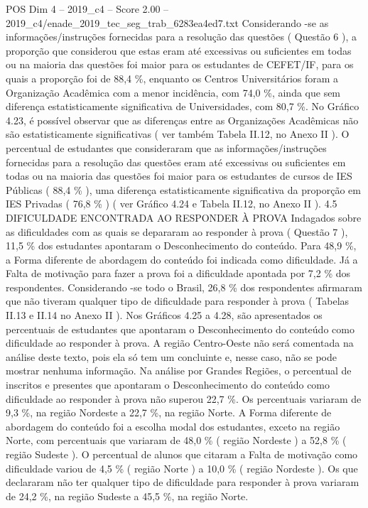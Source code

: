 \begin{textsample}{POS Dim 4 – 2019\_c4 – Score 2.00 – 2019\_c4/enade\_2019\_tec\_seg\_trab\_6283ea4ed7.txt}
Considerando -se as informações/instruções fornecidas para a resolução das questões ( Questão 6 ), a proporção que considerou que estas eram até excessivas ou suficientes em todas ou na maioria das questões foi maior para os estudantes de CEFET/IF, para os quais a proporção foi de 88,4 \%, enquanto os Centros Universitários foram a Organização Acadêmica com a menor incidência, com 74,0 \%, ainda que sem diferença estatisticamente significativa de Universidades, com 80,7 \%.
No Gráfico 4.23, é possível observar que as diferenças entre as Organizações Acadêmicas não são estatisticamente significativas ( ver também Tabela II.12, no Anexo II ).
O percentual de estudantes que consideraram que as informações/instruções fornecidas para a resolução das questões eram até excessivas ou suficientes em todas ou na maioria das questões foi maior para os estudantes de cursos de IES Públicas ( 88,4 \% ), uma diferença estatisticamente significativa da proporção em IES Privadas ( 76,8 \% ) ( ver Gráfico 4.24 e Tabela II.12, no Anexo II ). 4.5 DIFICULDADE ENCONTRADA AO RESPONDER À PROVA Indagados sobre as dificuldades com as quais se depararam ao responder à prova ( Questão 7 ), 11,5 \% dos estudantes apontaram o Desconhecimento do conteúdo.
Para 48,9 \%, a Forma diferente de abordagem do conteúdo foi indicada como dificuldade.
Já a Falta de motivação para fazer a prova foi a dificuldade apontada por 7,2 \% dos respondentes.
Considerando -se todo o Brasil, 26,8 \% dos respondentes afirmaram que não tiveram qualquer tipo de dificuldade para responder à prova ( Tabelas II.13 e II.14 no Anexo II ).
Nos Gráficos 4.25 a 4.28, são apresentados os percentuais de estudantes que apontaram o Desconhecimento do conteúdo como dificuldade ao responder à prova.
A região Centro-Oeste não será comentada na análise deste texto, pois ela só tem um concluinte e, nesse caso, não se pode mostrar nenhuma informação.
Na análise por Grandes Regiões, o percentual de inscritos e presentes que apontaram o Desconhecimento do conteúdo como dificuldade ao responder à prova não superou 22,7 \%.
Os percentuais variaram de 9,3 \%, na região Nordeste a 22,7 \%, na região Norte.
A Forma diferente de abordagem do conteúdo foi a escolha modal dos estudantes, exceto na região Norte, com percentuais que variaram de 48,0 \% ( região Nordeste ) a 52,8 \% ( região Sudeste ).
O percentual de alunos que citaram a Falta de motivação como dificuldade variou de 4,5 \% ( região Norte ) a 10,0 \% ( região Nordeste ).
Os que declararam não ter qualquer tipo de dificuldade para responder à prova variaram de 24,2 \%, na região Sudeste a 45,5 \%, na região Norte.

\end{textsample}
